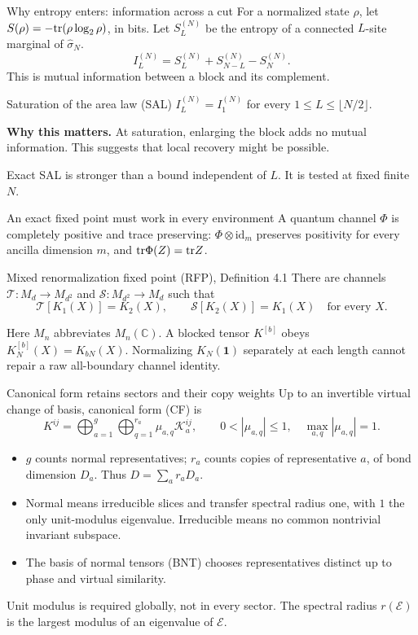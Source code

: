\documentclass[aspectratio=169,14pt]{beamer}
\newcommand{\E}{\mathcal E}
\newcommand{\Id}{\mathbf 1}
\newcommand{\cK}{\mathcal K}
\newcommand{\why}[1]{\textcolor{amber}{\textbf{Why this matters.}} #1\par\medskip}
\begin{document}
\begin{frame}{Why entropy enters: information across a cut}
For a normalized state $\rho$, let $S(\rho)=-\mathrm{tr}(\rho\log_2\rho)$, in bits.
Let $S_L^{(N)}$ be the entropy of a connected $L$-site marginal of $\widehat\sigma_N$.
\[
 I_L^{(N)}=S_L^{(N)}+S_{N-L}^{(N)}-S_N^{(N)}.
\]
This is mutual information between a block and its complement.
\begin{block}{Saturation of the area law (SAL)}
$I_L^{(N)}=I_1^{(N)}$ for every $1\leq L\leq\lfloor N/2\rfloor$.
\end{block}
\why{At saturation, enlarging the block adds no mutual information. This suggests that local recovery might be possible.}
Exact SAL is stronger than a bound independent of $L$. It is tested at fixed finite $N$.
\end{frame}
\begin{frame}{An exact fixed point must work in every environment}
A quantum channel $\Phi$ is completely positive and trace preserving:
$\Phi\otimes\mathrm{id}_m$ preserves positivity for every ancilla dimension $m$,
and $\mathrm{tr}\Phi(Z)=\mathrm{tr} Z$.
\begin{block}{Mixed renormalization fixed point (RFP), Definition 4.1}
There are channels $\mathcal T:M_d\to M_{d^2}$ and
$\mathcal S:M_{d^2}\to M_d$ such that
\[
 \mathcal T[K_1(X)]=K_2(X),\qquad
 \mathcal S[K_2(X)]=K_1(X)\quad\text{for every }X.
\]
\end{block}
Here $M_n$ abbreviates $M_n(\mathbb C)$. A blocked tensor $K^{[b]}$ obeys
$K^{[b]}_N(X)=K_{bN}(X)$.
\alert{Normalizing $K_N(\Id)$ separately at each length cannot repair a raw all-boundary channel identity.}
\end{frame}
\begin{frame}{Canonical form retains sectors and their copy weights}
Up to an invertible virtual change of basis, canonical form (CF) is
\[
 K^{ij}=\bigoplus_{a=1}^{g}\bigoplus_{q=1}^{r_a}\mu_{a,q}\cK_a^{ij},
 \qquad 0<|\mu_{a,q}|\leq1,\quad\max_{a,q}|\mu_{a,q}|=1.
\]
\begin{itemize}
\item $g$ counts normal representatives; $r_a$ counts copies of representative $a$, of bond dimension $D_a$. Thus $D=\sum_a r_aD_a$.
\item Normal means irreducible slices and transfer spectral radius one, with $1$ the only unit-modulus eigenvalue. Irreducible means no common nontrivial invariant subspace.
\item The basis of normal tensors (BNT) chooses representatives distinct up to phase and virtual similarity.
\end{itemize}
\alert{Unit modulus is required globally, not in every sector.}
The spectral radius $r(\E)$ is the largest modulus of an eigenvalue of $\E$.
\end{frame}
\end{document}
